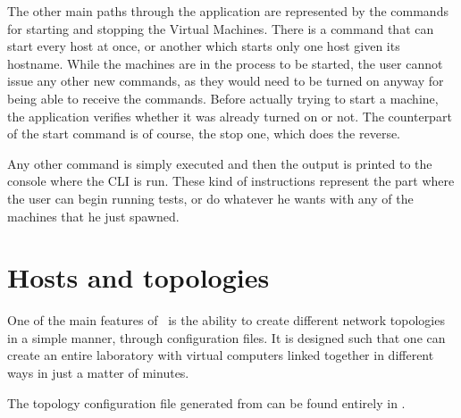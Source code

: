 The other main paths through the application are represented by the commands for starting and stopping the Virtual Machines.
There is a command that can start every host at once, or another which starts only one host given its hostname.
While the machines are in the process to be started, the user cannot issue any other new commands, as they would need to be turned on anyway for being able to receive the commands.
Before actually trying to start a machine, the application verifies whether it was already turned on or not.
The counterpart of the start command is of course, the stop one, which does the reverse.

Any other command is simply executed and then the output is printed to the console where the CLI is run.
These kind of instructions represent the part where the user can begin running tests, or do whatever he wants with any of the machines that he just spawned.

\section{Hosts and topologies}
\label{sec:hosts-and-topologies}

One of the main features of \project\ is the ability to create different network topologies in a simple manner, through configuration files.
It is designed such that one can create an entire laboratory with virtual computers linked together in different ways in just a matter of minutes.



The topology configuration file generated from  can be found entirely in .